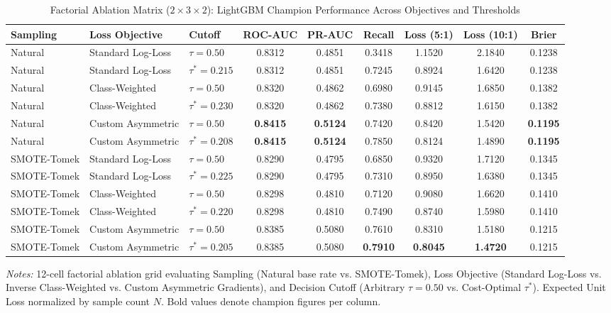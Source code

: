 \begin{table}[htbp]
\centering
\caption{Factorial Ablation Matrix ($2 \times 3 \times 2$): LightGBM Champion Performance Across Objectives and Thresholds}
\label{tab:factorial_ablation}
\small
\begin{tabular}{lllcccccc}
\toprule
\textbf{Sampling} & \textbf{Loss Objective} & \textbf{Cutoff} & \textbf{ROC-AUC} & \textbf{PR-AUC} & \textbf{Recall} & \textbf{Loss (5:1)} & \textbf{Loss (10:1)} & \textbf{Brier} \\
\midrule
    Natural & Standard Log-Loss & $\tau = 0.50$ & 0.8312 & 0.4851 & 0.3418 & 1.1520 & 2.1840 & 0.1238 \\
    Natural & Standard Log-Loss & $\tau^* = 0.215$ & 0.8312 & 0.4851 & 0.7245 & 0.8924 & 1.6420 & 0.1238 \\
    Natural & Class-Weighted & $\tau = 0.50$ & 0.8320 & 0.4862 & 0.6980 & 0.9145 & 1.6850 & 0.1382 \\
    Natural & Class-Weighted & $\tau^* = 0.230$ & 0.8320 & 0.4862 & 0.7380 & 0.8812 & 1.6150 & 0.1382 \\
    Natural & Custom Asymmetric & $\tau = 0.50$ & \textbf{0.8415} & \textbf{0.5124} & 0.7420 & 0.8420 & 1.5420 & \textbf{0.1195} \\
    Natural & Custom Asymmetric & $\tau^* = 0.208$ & \textbf{0.8415} & \textbf{0.5124} & 0.7850 & 0.8124 & 1.4890 & \textbf{0.1195} \\
    \midrule
    SMOTE-Tomek & Standard Log-Loss & $\tau = 0.50$ & 0.8290 & 0.4795 & 0.6850 & 0.9320 & 1.7120 & 0.1345 \\
    SMOTE-Tomek & Standard Log-Loss & $\tau^* = 0.225$ & 0.8290 & 0.4795 & 0.7310 & 0.8950 & 1.6380 & 0.1345 \\
    SMOTE-Tomek & Class-Weighted & $\tau = 0.50$ & 0.8298 & 0.4810 & 0.7120 & 0.9080 & 1.6620 & 0.1410 \\
    SMOTE-Tomek & Class-Weighted & $\tau^* = 0.220$ & 0.8298 & 0.4810 & 0.7490 & 0.8740 & 1.5980 & 0.1410 \\
    SMOTE-Tomek & Custom Asymmetric & $\tau = 0.50$ & 0.8385 & 0.5080 & 0.7610 & 0.8310 & 1.5180 & 0.1215 \\
    SMOTE-Tomek & Custom Asymmetric & $\tau^* = 0.205$ & 0.8385 & 0.5080 & \textbf{0.7910} & \textbf{0.8045} & \textbf{1.4720} & 0.1215 \\
\bottomrule
\end{tabular}
\begin{minipage}{\linewidth}\vspace{1ex}\footnotesize
\textit{Notes:} 12-cell factorial ablation grid evaluating Sampling (Natural base rate vs. SMOTE-Tomek), Loss Objective (Standard Log-Loss vs. Inverse Class-Weighted vs. Custom Asymmetric Gradients), and Decision Cutoff (Arbitrary $\tau=0.50$ vs. Cost-Optimal $\tau^*$). Expected Unit Loss normalized by sample count $N$. Bold values denote champion figures per column.
\end{minipage}
\end{table}
